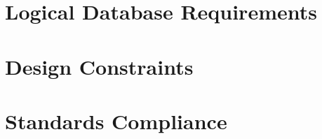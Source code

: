 \documentclass{scrreprt}
\begin{document}
\section{Logical Database Requirements}

\section{Design Constraints}

\section{Standards Compliance}

\end{document}
